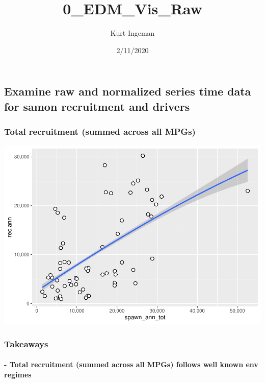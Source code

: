 \documentclass[]{article}
\title{0\_EDM\_Vis\_Raw}
\author{Kurt Ingeman}
\date{2/11/2020}
\let\oldparagraph\paragraph
\renewcommand{\paragraph}[1]{\oldparagraph{#1}\mbox{}}
\begin{document}
\maketitle

\hypertarget{examine-raw-and-normalized-series-time-data-for-samon-recruitment-and-drivers}{%
\subsection{Examine raw and normalized series time data for samon
recruitment and
drivers}\label{examine-raw-and-normalized-series-time-data-for-samon-recruitment-and-drivers}}

\hypertarget{total-recruitment-summed-across-all-mpgs}{%
\subsubsection{Total recruitment (summed across all
MPGs)}\label{total-recruitment-summed-across-all-mpgs}}

\includegraphics{0_EDM_Vis_Raw_files/figure-latex/unnamed-chunk-4-1.pdf}

\hypertarget{takeaways}{%
\subsubsection{Takeaways}\label{takeaways}}

\hypertarget{total-recruitment-summed-across-all-mpgs-follows-well-known-env-regimes}{%
\paragraph{- Total recruitment (summed across all MPGs) follows well
known env
regimes}\label{total-recruitment-summed-across-all-mpgs-follows-well-known-env-regimes}}
\end{document}
